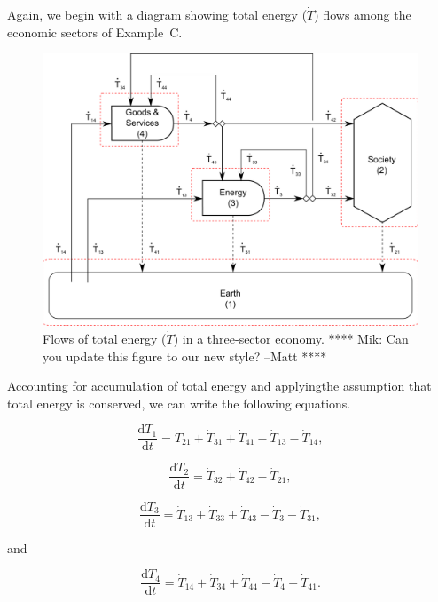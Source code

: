 Again, we begin with a diagram showing total energy ($\dot{T}$) flows
among the economic sectors of Example~C.

\begin{figure}[h!]
\includegraphics[width=1.0\linewidth]{Part_2/Chapter_Embodied/images/I-O_three_sector_total_energy.pdf}
\caption{Flows of total energy ($\dot{T}$) in a three-sector economy.
**** Mik: Can you update this figure to our new style? --Matt ****}
\label{fig:C_total_energy}
\end{figure}

Accounting for accumulation of total energy and 
applyingthe assumption that total energy is conserved, 
we can write the following equations.

\begin{equation} \label{eq:C-CV_T_1}
	\frac{\mathrm{d}T_{1}}{\mathrm{d}t} 	 
	= \dot{T}_{21} 
	+ \dot{T}_{31} 
	+ \dot{T}_{41} 
	- \dot{T}_{13} 
	- \dot{T}_{14},
\end{equation}

\begin{equation} \label{eq:C-CV_T_2}
	\frac{\mathrm{d}T_{2}}{\mathrm{d}t} 	 
	= \dot{T}_{32} 
	+ \dot{T}_{42} 
	- \dot{T}_{21},
\end{equation}

\begin{equation} \label{eq:C-CV_T_3}
	\frac{\mathrm{d}T_{3}}{\mathrm{d}t} 	 
	= \dot{T}_{13} 
	+ \dot{T}_{33} 
	+ \dot{T}_{43} 
	- \dot{T}_{3} 
	- \dot{T}_{31},
\end{equation}

\noindent and 

\begin{equation} \label{eq:C-CV_T_4}
	\frac{\mathrm{d}T_{4}}{\mathrm{d}t} 	 
	= \dot{T}_{14} 
	+ \dot{T}_{34} 
	+ \dot{T}_{44} 
	- \dot{T}_{4} 
	- \dot{T}_{41}.
\end{equation}

